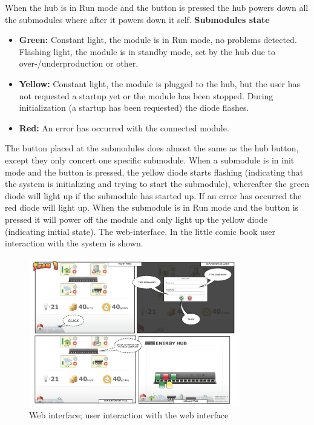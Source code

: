 		When the hub is in Run mode and the button is pressed the hub powers down all the submodules where after it powers down it self.
		\textbf{Submodules state}
		\begin{itemize}
			\item \textbf{Green: }Constant light, the module is in Run mode, no problems detected. Flashing light, the module is in standby mode, set by the hub
							due to over-/underproduction or other.
			\item \textbf{Yellow: }Constant light, the module is plugged to the hub, but the user has not requested a startup yet or the module has been stopped.
							During initialization (a startup has been requested) the diode flashes.
			\item \textbf{Red: }An error has occurred with the connected module.
		\end{itemize}
		The button placed at the submodules does almost the same as the hub button, except they only concert one specific submodule. When a submodule 
		is in init mode and the button is pressed, the yellow diode starts flashing (indicating that the system is initializing and trying to start the submodule), whereafter
		the green diode will light up if the submodule has started up. If an error has occurred the red diode will light up. 
		When the submodule is in Run mode and the button is pressed it will power off the module and only light up the yellow diode (indicating initial state).
		\newpage
		The web-interface. In the little comic book user interaction with the system is shown.
		\begin{figure}[h!]		%
			\begin{centering}
				 \includegraphics[width=0.82\textwidth]{images/web_interface1.jpg}
				\caption{Web interface; user interaction with the web interface}
		 	\end{centering}
		\end{figure}

